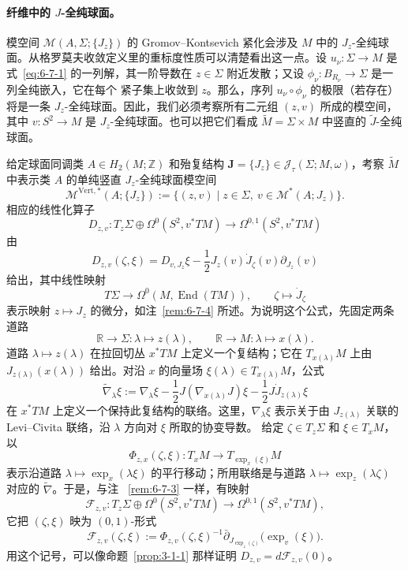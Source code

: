 \paragraph{纤维中的 $J$-全纯球面。}
模空间 $\mathcal M(A,\Sigma;\{J_z\})$ 的 Gromov--Kontsevich 紧化会涉及 $M$ 中的
$J_z$-全纯球面。从格罗莫夫收敛定义里的重标度性质可以清楚看出这一点。设
$u_\nu:\Sigma\to M$ 是式~\eqref{eq:6-7-1} 的一列解，其一阶导数在
$z\in\Sigma$ 附近发散；又设 $\phi_\nu:B_{R_\nu}\to\Sigma$ 是一列全纯嵌入，它在每个
紧子集上收敛到 $z$。那么，序列 $u_\nu\circ\phi_\nu$ 的极限（若存在）将是一条
$J_z$-全纯球面。因此，我们必须考察所有二元组 $(z,v)$ 所成的模空间，其中
$v:S^2\to M$ 是 $J_z$-全纯球面。也可以把它们看成
$\widetilde M=\Sigma\times M$ 中竖直的 $\widetilde J$-全纯球面。

给定球面同调类 $A\in H_2(M;\mathbb Z)$ 和殆复结构
$\mathbf J=\{J_z\}\in\mathcal J_\tau(\Sigma;M,\omega)$，考察 $\widetilde M$ 中表示类 $A$
的单纯竖直 $J_z$-全纯球面模空间
\[
  \mathcal M^{\mathrm{Vert},*}(A;\{J_z\})
  :=\bigl\{(z,v)\mid z\in\Sigma,\ v\in\mathcal M^*(A;J_z)\bigr\}.
\]
相应的线性化算子
\begin{equation}\label{eq:6-7-8}
  D_{z,v}:T_z\Sigma\oplus\Omega^0(S^2,v^*TM)
  \longrightarrow\Omega^{0,1}(S^2,v^*TM)
\end{equation}
由
\[
  D_{z,v}(\zeta,\xi)
  =D_{v,J_z}\xi-\frac12J_z(v)\dot J_\zeta(v)\partial_{J_z}(v)
\]
给出，其中线性映射
\[
  T\Sigma\longrightarrow\Omega^0(M,\operatorname{End}(TM)),
  \qquad \zeta\longmapsto\dot J_\zeta
\]
表示映射 $z\mapsto J_z$ 的微分，如注~\ref{rem:6-7-4} 所述。为说明这个公式，先固定两条
道路
\[
  \mathbb R\longrightarrow\Sigma:\lambda\longmapsto z(\lambda),
  \qquad
  \mathbb R\longrightarrow M:\lambda\longmapsto x(\lambda).
\]
道路 $\lambda\mapsto z(\lambda)$ 在拉回切丛 $x^*TM$ 上定义一个复结构；它在
$T_{x(\lambda)}M$ 上由 $J_{z(\lambda)}(x(\lambda))$ 给出。对沿 $x$ 的向量场
$\xi(\lambda)\in T_{x(\lambda)}M$，公式
\[
  \widetilde\nabla_\lambda\xi
  :=\nabla_\lambda\xi
    -\frac12J(\nabla_{\dot x(\lambda)}J)\xi
    -\frac12J\dot J_{\dot z(\lambda)}\xi
\]
在 $x^*TM$ 上定义一个保持此复结构的联络。这里，$\nabla_\lambda\xi$ 表示关于由
$J_{z(\lambda)}$ 关联的 Levi--Civita 联络，沿 $\lambda$ 方向对 $\xi$ 所取的协变导数。
给定 $\zeta\in T_z\Sigma$ 和 $\xi\in T_xM$，以
\[
  \Phi_{z,x}(\zeta,\xi):T_xM\longrightarrow T_{\exp_x(\xi)}M
\]
表示沿道路 $\lambda\mapsto\exp_x(\lambda\xi)$ 的平行移动；所用联络是与道路
$\lambda\mapsto\exp_z(\lambda\zeta)$ 对应的 $\widetilde\nabla$。于是，与注
~\ref{rem:6-7-3} 一样，有映射
\[
  \mathcal F_{z,v}:T_z\Sigma\oplus\Omega^0(S^2,v^*TM)
  \longrightarrow\Omega^{0,1}(S^2,v^*TM),
\]
它把 $(\zeta,\xi)$ 映为 $(0,1)$-形式
\[
  \mathcal F_{z,v}(\zeta,\xi)
  :=\Phi_{z,v}(\zeta,\xi)^{-1}
    \bar\partial_{J_{\exp_z(\zeta)}}\bigl(\exp_v(\xi)\bigr).
\]
用这个记号，可以像命题~\ref{prop:3-1-1} 那样证明
$D_{z,v}=d\mathcal F_{z,v}(0)$。

